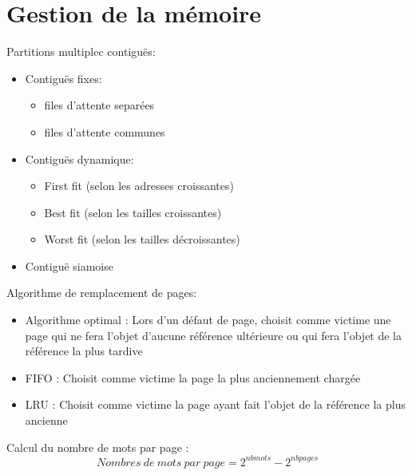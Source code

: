 \documentclass[11pt,a4paper,oneside,french,svgnames]{report}
\begin{document}
\section*{Gestion de la mémoire}
Partitions  multiplec contiguës:
\begin{itemize}
\item Contiguës fixes:
\begin{itemize}
\item files d'attente separées
\item files d'attente communes
\end{itemize}
\item Contiguës dynamique:
\begin{itemize}
\item First fit (selon les adresses croissantes)
\item Best fit (selon les tailles croissantes)
\item Worst fit (selon les tailles décroissantes)
\end{itemize}
\item Contiguë siamoise
\end{itemize}

Algorithme de remplacement de pages:
\begin{itemize}
\item Algorithme optimal : Lors d'un défaut de page, choisit comme victime une page qui ne fera l'objet d'aucune référence ultérieure  ou qui fera l'objet de la référence la plus tardive
\item FIFO : Choisit comme victime la page la plus anciennement chargée
\item LRU  : Choisit comme victime la page ayant fait l'objet de la référence la plus ancienne
\end{itemize}

Calcul du nombre de mots par page :
\begin{equation}
Nombres~de~mots~par~page = 2^{nbmots} - 2^{nbpages}
\end{equation}
\end{document}
